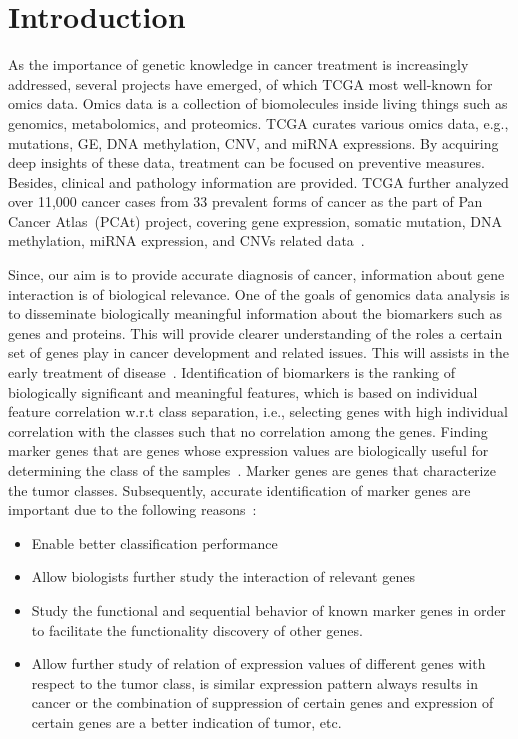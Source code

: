 \section{Introduction}\label{chapter_5:intro}
As the importance of genetic knowledge in cancer treatment is increasingly addressed, several projects have emerged, of which TCGA most well-known for omics data. Omics data is a collection of biomolecules inside living things such as genomics, metabolomics, and proteomics. TCGA curates various omics data, e.g., mutations, GE, DNA methylation, CNV, and miRNA expressions. By acquiring deep insights of these data, treatment can be focused on preventive measures. Besides, clinical and pathology information are provided. TCGA further analyzed over 11,000 cancer cases from 33 prevalent forms of cancer as the part of Pan Cancer Atlas~(PCAt) project, covering gene expression, somatic mutation, DNA methylation, miRNA expression, and CNVs related data~\cite{lyu2018deep}. 

\hspace*{3.5mm} Since, our aim is to provide accurate diagnosis of cancer, information about gene interaction is of biological relevance. One of the goals of genomics data analysis is to disseminate biologically meaningful information about the biomarkers such as genes and proteins. This will provide clearer understanding of the roles a certain set of genes play in cancer development and related issues. This will assists in the  early treatment of disease~\cite{lu2003cancer}. %
Identification of biomarkers is the ranking of biologically significant and meaningful features, which is based on individual feature correlation w.r.t class separation, i.e., selecting genes with high individual correlation with the classes such that no correlation among the genes. Finding marker genes that are genes whose expression values are biologically useful for determining the class of the samples~\cite{lu2003cancer}. Marker genes are genes that characterize the tumor classes. Subsequently, accurate identification of marker genes are important due to the following reasons~\cite{lu2003cancer}:

\begin{itemize}[noitemsep]
    \item Enable better classification performance
    \item Allow biologists further study the interaction of relevant genes 
    \item Study the functional and sequential behavior of known marker genes in order to facilitate the functionality discovery of other genes.
    \item Allow further study of relation of expression values of different genes with respect to the tumor class, is similar expression pattern always results in cancer or the combination of suppression of certain genes and expression of certain genes are a better indication of tumor, etc.
\end{itemize}

